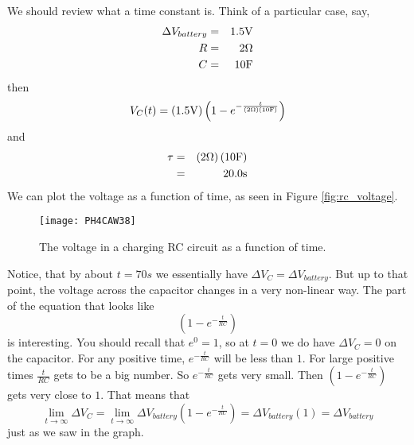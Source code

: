 We should review what a time constant is. Think of a particular case, say, 
\begin{eqnarray*}
\Delta V_{battery} &=&1.5\unit{V} \\
R &=&2\unit{%
\Omega%
} \\
C &=&10\unit{F}
\end{eqnarray*}%
then%
\begin{equation*}
V_{C}(t)=\left( 1.5\unit{V}\right) \left( 1-e^{-\frac{t}{\left( 2\unit{%
\Omega%
}\right) \left( 10\unit{F}\right) }}\right)
\end{equation*}%
and 
\begin{eqnarray*}
\tau &=&\left( 2\unit{%
\Omega%
}\right) \left( 10\unit{F}\right) \\
&=&\allowbreak 20.0\unit{s}
\end{eqnarray*}%
We can plot the voltage as a function of time, as seen in 
Figure \ref{fig:rc_voltage}.
\begin{figure}[tbp!]
	\centering
\texttt{[image: PH4CAW38]}
	\caption{The voltage in a charging RC circuit as a function of time.}
	\label{fig:rc_charge}
\end{figure}
Notice, that by about $t=70\unit{s%
}$ we essentially have $\Delta V_{C}=\Delta V_{battery}.$ But up to that
point, the voltage across the capacitor changes in a very non-linear way.
The part of the equation that looks like%
\begin{equation*}
\left( 1-e^{-\frac{t}{RC}}\right)
\end{equation*}%
is interesting. You should recall that $e^{0}=1$, so at $t=0$ we do have 
$\Delta V_{C}=0$ on the capacitor.
For any positive time, $e^{-\frac{t}{RC}}$ will be less than $1.$ For large
positive times $\frac{t}{RC}$ gets to be a big number. So $e^{-\frac{t}{RC}}$
gets very small. Then $\left( 1-e^{-\frac{t}{RC}}\right) $ gets very close
to $1.$ That means that 
\begin{equation*}
\underset{t\rightarrow \infty }{\lim }\Delta V_{C}=\underset{t\rightarrow
\infty }{\lim }\Delta V_{battery}\left( 1-e^{-\frac{t}{RC}}\right) =\Delta
V_{battery}\left( 1\right) =\Delta V_{battery}
\end{equation*}%
just as we saw in the graph.

